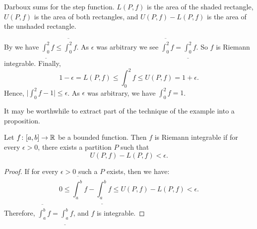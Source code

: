 \begin{example}
\begin{myfigureht}
\caption{Darboux sums for the step function.  $L(P,f)$ is the area of the
shaded rectangle, $U(P,f)$ is the area of both rectangles, and
$U(P,f)-L(P,f)$ is the area of the unshaded rectangle.\label{darbouxfigstep}}
\end{myfigureht}
By  we have $\underline{\int_0^2} f \leq \overline{\int_0^2} f$.
As $\epsilon$ was arbitrary we see 
$\overline{\int_0^2} f = \underline{\int_0^2} f$.  So $f$ is Riemann
integrable.  Finally,
\begin{equation*}
1-\epsilon = L(P,f) \leq \int_0^2 f \leq U(P,f) =
1+\epsilon.
\end{equation*}
Hence, $\bigl\lvert \int_0^2 f - 1 \bigr\rvert \leq \epsilon$.  As $\epsilon$ was arbitrary,
we have $\int_0^2 f = 1$.
\end{example}

It may be worthwhile to extract part of the technique of the example into a
proposition.

\begin{prop}
Let $f \colon [a,b] \to {\mathbb{R}}$ be a bounded function.  Then $f$ is Riemann
integrable if for every $\epsilon > 0$, there exists a partition $P$ such that
\begin{equation*}
U(P,f) - L(P,f) < \epsilon .
\end{equation*}
\end{prop}

\begin{proof}
If for every $\epsilon > 0$ such a $P$ exists, then we have:
\begin{equation*}
0 \leq
\overline{\int_a^b} f - 
\underline{\int_a^b} f
\leq
U(P,f) - L(P,f) < \epsilon .
\end{equation*}
Therefore, 
$\overline{\int_a^b} f = \underline{\int_a^b} f$, and $f$ is integrable.
\end{proof}

